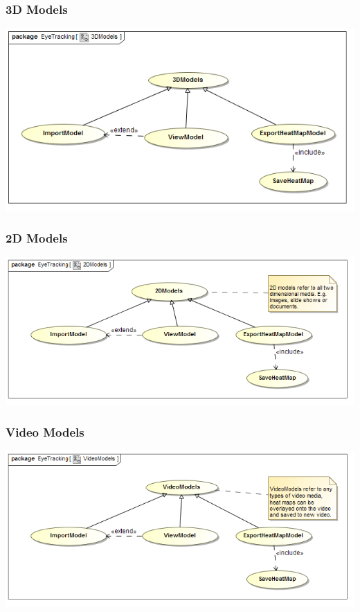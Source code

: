 	
	\subsubsection{3D Models}
		\includegraphics[scale=0.5]{Diagrams/Use_Case_Diagram__3DModels.png}
		
		
	\subsubsection{2D Models}
		\includegraphics[scale=0.5]{Diagrams/Use_Case_Diagram__2DModels.png}
		
		
	\subsubsection{Video Models}
		\includegraphics[scale=0.5]{Diagrams/Use_Case_Diagram__VideoModels.png}
		
